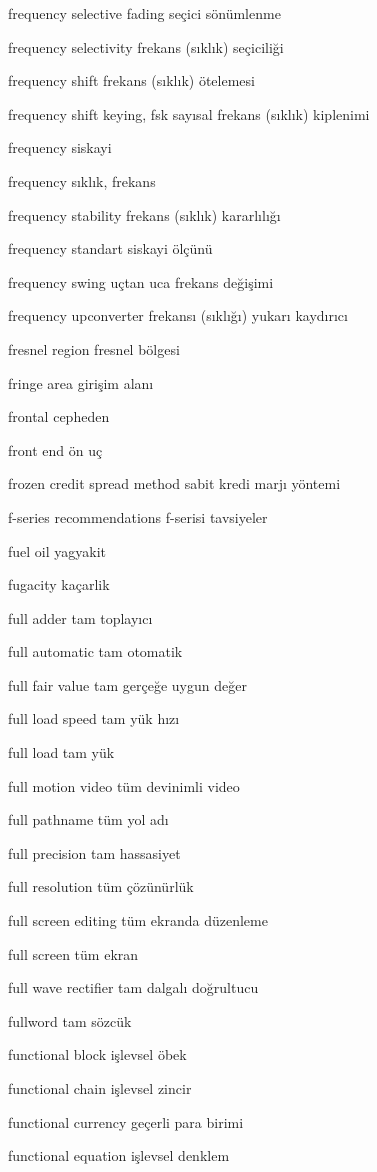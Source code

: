 \documentclass[12pt,fleqn]{article}\usepackage{../../common}
\begin{document}
frequency selective fading seçici sönümlenme

frequency selectivity frekans (sıklık) seçiciliği

frequency shift frekans (sıklık) ötelemesi

frequency shift keying, fsk sayısal frekans (sıklık) kiplenimi

frequency siskayi

frequency sıklık, frekans

frequency stability frekans (sıklık) kararlılığı

frequency standart siskayi ölçünü

frequency swing uçtan uca frekans değişimi

frequency upconverter frekansı (sıklığı) yukarı kaydırıcı

fresnel region fresnel bölgesi

fringe area girişim alanı

frontal cepheden

front end ön uç

frozen credit spread method sabit kredi marjı yöntemi

f-series recommendations f-serisi tavsiyeler

fuel oil yagyakit

fugacity kaçarlik

full adder tam toplayıcı

full automatic tam otomatik

full fair value tam gerçeğe uygun değer

full load speed tam yük hızı

full load tam yük

full motion video tüm devinimli video

full pathname tüm yol adı

full precision tam hassasiyet

full resolution tüm çözünürlük

full screen editing tüm ekranda düzenleme

full screen tüm ekran

full wave rectifier tam dalgalı doğrultucu

fullword tam sözcük

functional block işlevsel öbek

functional chain işlevsel zincir

functional currency geçerli para birimi

functional equation işlevsel denklem
\end{document}

